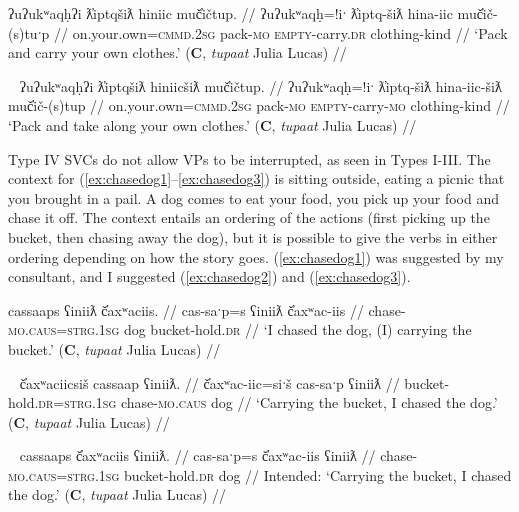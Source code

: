 \ex \label{ex:packandcarry}
\begingl
\glpreamble ʔuʔukʷaqḥʔi ƛ̓iptqšiƛ hiniic muč̓ičtup. //
\gla ʔuʔukʷaqḥ=!iˑ ƛ̓iptq-šiƛ hina-iic muč̓ič-(s)tuˑp //
\glb on.your.own=\textsc{cmmd.2sg} pack-\textsc{mo} \textsc{empty}-carry.\textsc{dr} clothing-kind //
\glft `Pack and carry your own clothes.' (\textbf{C}, \textit{tupaat} Julia Lucas) //
\endgl
\xe

\ex~ \label{ex:packandtake}
\begingl
\glpreamble ʔuʔukʷaqḥʔi ƛ̓iptqšiƛ hiniicšiƛ muč̓ičtup. //
\gla ʔuʔukʷaqḥ=!iˑ ƛ̓iptq-šiƛ hina-iic-šiƛ muč̓ič-(s)tup //
\glb on.your.own=\textsc{cmmd.2sg} pack-\textsc{mo} \textsc{empty}-carry-\textsc{mo} clothing-kind //
\glft `Pack and take along your own clothes.' (\textbf{C}, \textit{tupaat} Julia Lucas) //
\endgl
\xe

Type IV SVCs do not allow VPs to be interrupted, as seen in Types I-III. The context for (\ref{ex:chasedog1}--\ref{ex:chasedog3}) is sitting outside, eating a picnic that you brought in a pail. A dog comes to eat your food, you pick up your food and chase it off. The context entails an ordering of the actions (first picking up the bucket, then chasing away the dog), but it is possible to give the verbs in either ordering depending on how the story goes. (\ref{ex:chasedog1}) was suggested by my consultant, and I suggested (\ref{ex:chasedog2}) and (\ref{ex:chasedog3}). 

\ex \label{ex:chasedog1}
\begingl
\glpreamble cassaaps ʕiniiƛ č̓axʷaciis. //
\gla cas-saˑp=s ʕiniiƛ č̓axʷac-iis //
\glb chase-\textsc{mo.caus}=\textsc{strg.1sg} dog bucket-hold.\textsc{dr} //
\glft `I chased the dog, (I) carrying the bucket.' (\textbf{C}, \textit{tupaat} Julia Lucas) //
\endgl
\xe

\ex~ \label{ex:chasedog2}
\begingl
\glpreamble č̓axʷaciicsiš cassaap ʕiniiƛ. //
\gla č̓axʷac-iic=siˑš cas-saˑp ʕiniiƛ //
\glb bucket-hold.\textsc{dr}=\textsc{strg.1sg} chase-\textsc{mo.caus} dog //
\glft `Carrying the bucket, I chased the dog.' (\textbf{C}, \textit{tupaat} Julia Lucas) //
\endgl
\xe

\ex~ \label{ex:chasedog3}
\begingl
\glpreamble *cassaaps č̓axʷaciis ʕiniiƛ. //
\gla cas-saˑp=s č̓axʷac-iis ʕiniiƛ //
\glb chase-\textsc{mo.caus}=\textsc{strg.1sg} bucket-hold.\textsc{dr} dog //
\glft Intended: `Carrying the bucket, I chased the dog.' (\textbf{C}, \textit{tupaat} Julia Lucas) //
\endgl
\xe


